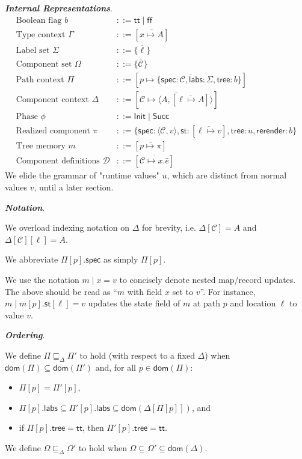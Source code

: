 \documentclass{article}
\newcommand{\num}[1]{\overline{#1}}
\newcommand{\mf}[1]{\mathsf{#1}}
\newcommand{\mc}[1]{\mathcal{#1}}
\newcommand{\tb}[1]{\textbf{#1}}
\newcommand{\dom}{\mf{dom}}
\newcommand{\pair}[2]{\langle #1, #2 \rangle}
\newcommand{\map}[2]{[\num{#1 \mapsto #2}]}
\newcommand{\ptp}{A}
\newcommand{\podl}{\sqsubseteq_\Delta}
\renewcommand{\tt}{\mf{tt}}
\newcommand{\ff}{\mf{ff}}
\newcommand{\C}{\mc{C}}
\newcommand{\D}{\mc{D}}
\begin{document}
\emph{\tb{Internal Representations}}.
\begin{align*}
\text{Boolean flag }b &::= \tt \mid \ff\\
\text{Type context }\Gamma &::= \map{x}{\ptp}\\
\text{Label set }\Sigma &::=\{\num{\ell}\}\\
\text{Component set }\Omega &::=\{\num{\C}\}\\
\text{Path context }\Pi &::= \map{p}{\{
    \mf{spec}: \C, \mf{labs}: \Sigma, \mf{tree}: b
\}}\\
\text{Component context }\Delta &::= \map{\C}{\pair{\ptp}{\map{\ell}{\ptp}}}\\
\text{Phase }\phi &::= \mf{Init} \mid \mf{Succ}\\
\text{Realized component }\pi &::= \{\mf{spec}: \pair{\C}{v}, 
\mf{st}: \map{\ell}{v}, \mf{tree}: u, \mf{rerender}: b\}\\
\text{Tree memory }m &::= \map{p}{\pi}\\
\text{Component definitions }\D &::= \map{\C}{x.\hat{e}}
\end{align*}
We elide the grammar of "runtime values" $u$,
which are distinct from normal values $v$, until a later section.

\emph{\tb{Notation}}.

We overload indexing notation on $\Delta$ for brevity,
i.e. $\Delta[\C]=\ptp$ and $\Delta[\C][\ell]=\ptp$.

We abbreviate $\Pi[p].\mf{spec}$ as simply $\Pi[p]$.

We use the notation $m \mid x = v$
to concisely denote nested map/record updates.
The above should be read as ``$m$ with field $x$ set to $v$''.
For instance, $m \mid m[p].\mf{st}[\ell] = v$ updates the
state field of $m$ at path $p$ and location $\ell$ to value $v$.

\emph{\tb{Ordering}}.

We define $\Pi \podl \Pi'$ to hold (with respect to a fixed $\Delta$)
when $\dom(\Pi) \subseteq \dom(\Pi')$
and, for all $p \in \mf{dom}(\Pi)$: \begin{itemize}
\item $\Pi[p] = \Pi'[p]$,
\item $\Pi[p].\mf{labs} \subseteq \Pi'[p].\mf{labs} \subseteq \dom(\Delta[\Pi[p]])$, and
\item if $\Pi[p].\mf{tree} = \mf{tt}$, then $\Pi'[p].\mf{tree} = \mf{tt}$.
\end{itemize}

We define $\Omega \podl \Omega'$ to hold
when $\Omega \subseteq \Omega' \subseteq \dom(\Delta)$.
\end{document}
